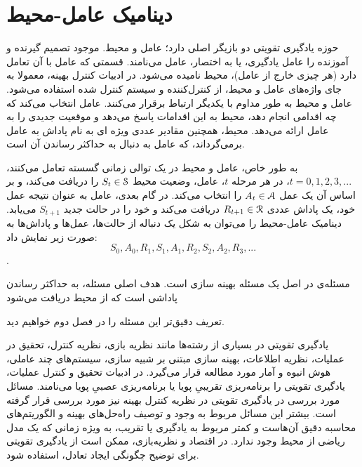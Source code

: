 \section{دینامیک عامل-محیط}
حوزه یادگیری تقویتی  دو بازیگر اصلی دارد؛ عامل و محیط. موجود تصمیم گیرنده و آموزنده را عامل یادگیری، یا به اختصار، عامل می‌نامند. قسمتی که عامل با آن تعامل دارد (هر چیزی خارج از عامل)، محیط نامیده می‌شود. در ادبیات کنترل بهینه، معمولا به جای واژه‌های عامل و محیط، از  کنترل‌کننده 
و سیستم کنترل شده  استفاده می‌شود.
عامل و محیط به طور مداوم با یکدیگر ارتباط برقرار می‌کنند. عامل انتخاب می‌کند که چه اقدامی‌ انجام دهد، محیط به این اقدامات پاسخ می‌دهد و موقعیت جدیدی را به عامل ارائه می‌دهد.
محیط، همچنین مقادیر عددی ویژه ای به نام پاداش  به عامل برمی‌گرداند، که عامل به دنبال به حداکثر رساندن آن است. 

به طور خاص، عامل و محیط در یک توالی زمانی گسسته تعامل می‌کنند، 
$t = 0,1,2,3,...$،
در هر مرحله $t$، عامل، وضعیت محیط  
$S_t \in \EuScript{S}$
را دریافت می‌کند، و بر اساس آن یک عمل 
$A_t \in \EuScript{A}$
را انتخاب می‌کند. در گام بعدی، عامل به عنوان نتیجه عمل خود، یک پاداش عددی $R_{t+1} \in \EuScript{R}$ دریافت می‌کند و خود را در حالت جدید $S_{t+1}$ می‌یابد.
دینامیک عامل-محیط را می‌توان به شکل یک دنباله از حالت‌ها، عمل‌ها و پاداش‌ها به صورت زیر نمایش داد:
$$S_0, A_0, R_1, S_1, A_1, R_2, S_2, A_2, R_3, ...$$.



مسئله‌ی  در اصل یک مسئله بهینه سازی است. هدف اصلی مسئله، به حداکثر رساندن پاداشی است که از محیط دریافت می‌شود

تعریف دقیق‌تر این مسئله را در فصل دوم خواهیم دید.

یادگیری تقویتی
در بسیاری از رشته‌ها مانند نظریه بازی، نظریه کنترل، تحقیق در عملیات، نظریه اطلاعات، بهینه سازی مبتنی بر شبیه سازی، سیستم‌های چند عاملی، هوش انبوه و آمار مورد مطالعه قرار می‌گیرد. در ادبیات تحقیق و کنترل عملیات، یادگیری تقویتی را برنامه‌ریزی تقریبیِ پویا   یا برنامه‌ریزی عصبیِ پویا   می‌نامند. مسائل مورد بررسی در یادگیری تقویتی در نظریه کنترل بهینه  نیز مورد بررسی قرار گرفته است. بیشتر این مسائل مربوط به وجود و توصیف راه‌حل‌های بهینه و الگوریتم‌های محاسبه دقیق آن‌هاست و کمتر مربوط به یادگیری یا تقریب، به ویژه زمانی که یک مدل ریاضی از محیط وجود ندارد. در اقتصاد و نظریه‌بازی، ممکن است از یادگیری تقویتی برای توضیح چگونگی ایجاد تعادل، استفاده شود.


